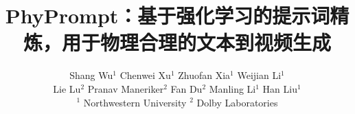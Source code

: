 \documentclass[10pt,twocolumn,letterpaper]{article}
\title{PhyPrompt：基于强化学习的提示词精炼，用于物理合理的文本到视频生成}
\author{
Shang Wu$^{1}$ \quad Chenwei Xu$^{1}$ \quad Zhuofan Xia$^{1}$ \quad Weijian Li$^{1}$ \\
Lie Lu$^{2}$ \quad Pranav Maneriker$^{2}$ \quad Fan Du$^{2}$ \quad Manling Li$^{1}$ \quad Han Liu$^{1}$\\
{\small $^{1}$ Northwestern University \quad $^{2}$ Dolby Laboratories}
}
\begin{document}
\maketitle




% 



{
    \small
    
    
}


\end{document}
